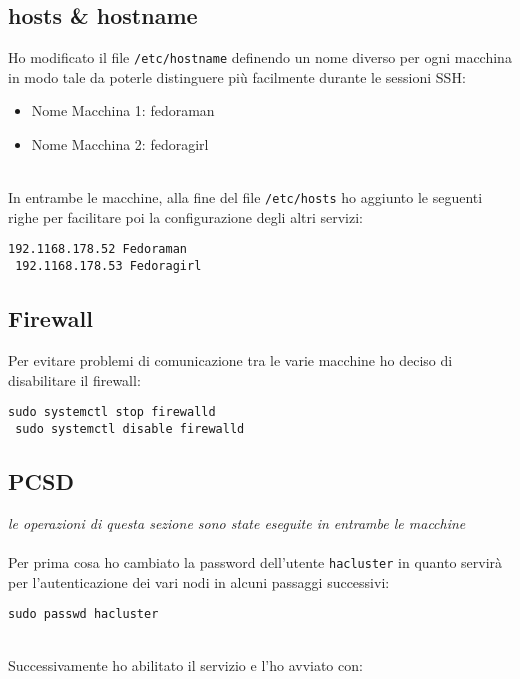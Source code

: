 \subsection{hosts \& hostname}
\label{sec:hosts}

Ho modificato il file \lstinline[style=cmd]|/etc/hostname| definendo un nome diverso per ogni macchina in modo tale da poterle distinguere pi\`{u} facilmente durante le sessioni SSH: 

\begin{itemize}
	\item Nome Macchina 1: fedoraman
	\item Nome Macchina 2: fedoragirl
\end{itemize}
\ \\
In entrambe le macchine, alla fine del file \lstinline[style=cmd]|/etc/hosts| ho aggiunto le seguenti righe per facilitare poi la configurazione degli altri servizi:

\begin{lstlisting}[style=cmd]
 192.1168.178.52 Fedoraman
 192.1168.178.53 Fedoragirl
\end{lstlisting}

\subsection{Firewall}

Per evitare problemi di comunicazione tra le varie macchine ho deciso di disabilitare il firewall:

\begin{lstlisting}[style=cmd]
 sudo systemctl stop firewalld
 sudo systemctl disable firewalld
\end{lstlisting}

\subsection{PCSD}
\label{sec:pcsd}
\textit{le operazioni di questa sezione sono state eseguite in entrambe le macchine }\\
\ \\
Per prima cosa ho cambiato la password dell'utente \lstinline[style=cmd]|hacluster| in quanto servir\`{a} per l'autenticazione dei vari nodi in alcuni passaggi successivi:

\begin{lstlisting}[style=cmd]
 sudo passwd hacluster
\end{lstlisting}
\ \\
Successivamente ho abilitato il servizio e l'ho avviato con:

